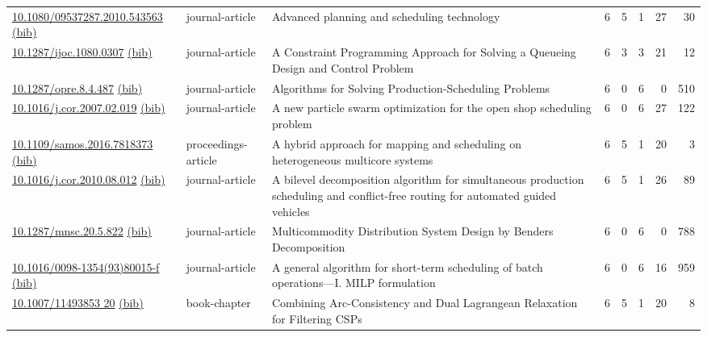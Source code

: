 {\begin{longtable}{p{5cm}lp{11cm}rrrrr}
\href{http://dx.doi.org/10.1080/09537287.2010.543563}{10.1080/09537287.2010.543563} \href{https://www.doi2bib.org/bib/10.1080/09537287.2010.543563}{(bib)} & journal-article & Advanced planning and scheduling technology & 6 & 5 & 1 & 27 & 30 \\
\href{http://dx.doi.org/10.1287/ijoc.1080.0307}{10.1287/ijoc.1080.0307} \href{https://www.doi2bib.org/bib/10.1287/ijoc.1080.0307}{(bib)} & journal-article & A Constraint Programming Approach for Solving a Queueing Design and Control Problem & 6 & 3 & 3 & 21 & 12 \\
\href{http://dx.doi.org/10.1287/opre.8.4.487}{10.1287/opre.8.4.487} \href{https://www.doi2bib.org/bib/10.1287/opre.8.4.487}{(bib)} & journal-article & Algorithms for Solving Production-Scheduling Problems & 6 & 0 & 6 & 0 & 510 \\
\href{http://dx.doi.org/10.1016/j.cor.2007.02.019}{10.1016/j.cor.2007.02.019} \href{https://www.doi2bib.org/bib/10.1016/j.cor.2007.02.019}{(bib)} & journal-article & A new particle swarm optimization for the open shop scheduling problem & 6 & 0 & 6 & 27 & 122 \\
\href{http://dx.doi.org/10.1109/samos.2016.7818373}{10.1109/samos.2016.7818373} \href{https://www.doi2bib.org/bib/10.1109/samos.2016.7818373}{(bib)} & proceedings-article & A hybrid approach for mapping and scheduling on heterogeneous multicore systems & 6 & 5 & 1 & 20 & 3 \\
\href{http://dx.doi.org/10.1016/j.cor.2010.08.012}{10.1016/j.cor.2010.08.012} \href{https://www.doi2bib.org/bib/10.1016/j.cor.2010.08.012}{(bib)} & journal-article & A bilevel decomposition algorithm for simultaneous production scheduling and conflict-free routing for automated guided vehicles & 6 & 5 & 1 & 26 & 89 \\
\href{http://dx.doi.org/10.1287/mnsc.20.5.822}{10.1287/mnsc.20.5.822} \href{https://www.doi2bib.org/bib/10.1287/mnsc.20.5.822}{(bib)} & journal-article & Multicommodity Distribution System Design by Benders Decomposition & 6 & 0 & 6 & 0 & 788 \\
\href{http://dx.doi.org/10.1016/0098-1354(93)80015-f}{10.1016/0098-1354(93)80015-f} \href{https://www.doi2bib.org/bib/10.1016/0098-1354(93)80015-f}{(bib)} & journal-article & A general algorithm for short-term scheduling of batch operations—I. MILP formulation & 6 & 0 & 6 & 16 & 959 \\
\href{http://dx.doi.org/10.1007/11493853_20}{10.1007/11493853 20} \href{https://www.doi2bib.org/bib/10.1007/11493853_20}{(bib)} & book-chapter & Combining Arc-Consistency and Dual Lagrangean Relaxation for Filtering CSPs & 6 & 5 & 1 & 20 & 8 \\

\end{longtable}}
